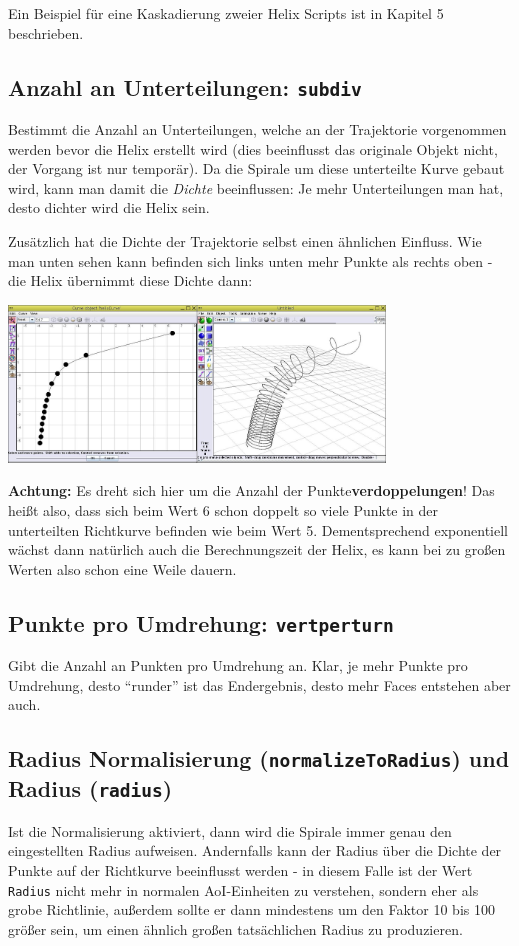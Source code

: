 \documentclass[12pt,a4paper]{scrartcl}
\begin{document}
Ein Beispiel für eine Kaskadierung zweier Helix Scripts ist in Kapitel 5
beschrieben.

\subsection{Anzahl an Unterteilungen: \texttt{subdiv}}
Bestimmt die Anzahl an Unterteilungen, welche an der Trajektorie vorgenommen
werden bevor die Helix erstellt wird (dies beeinflusst das originale Objekt
nicht, der Vorgang ist nur temporär). Da die Spirale um diese unterteilte Kurve
gebaut wird, kann man damit die \emph{Dichte} beeinflussen: Je mehr Unterteilungen
man hat, desto dichter wird die Helix sein.

Zusätzlich hat die Dichte der Trajektorie selbst einen ähnlichen Einfluss. Wie
man unten sehen kann befinden sich links unten mehr Punkte als rechts oben -
die Helix übernimmt diese Dichte dann:
\begin{center}
	\includegraphics[width=0.75\textwidth]{../pics/dichte-comp-1.jpg}
\end{center}

\textbf{Achtung:} Es dreht sich hier um die Anzahl der
Punkte\textbf{verdoppelungen}! Das heißt also, dass sich beim Wert 6 schon
doppelt so viele Punkte in der unterteilten Richtkurve befinden wie
beim Wert 5. Dementsprechend exponentiell wächst dann natürlich auch
die Berechnungszeit der Helix, es kann bei zu großen Werten also schon
eine Weile dauern.

\subsection{Punkte pro Umdrehung: \texttt{vertperturn}}
Gibt die Anzahl an Punkten pro Umdrehung an. Klar, je mehr Punkte pro
Umdrehung, desto ``runder'' ist das Endergebnis, desto mehr Faces
entstehen aber auch.

\subsection{Radius Normalisierung (\texttt{normalizeToRadius}) und Radius (\texttt{radius})}
Ist die Normalisierung aktiviert, dann wird die Spirale immer genau den 
eingestellten Radius aufweisen. Andernfalls kann der Radius über die
Dichte der Punkte auf der Richtkurve beeinflusst werden - in diesem Falle
ist der Wert \texttt{Radius} nicht mehr in normalen AoI-Einheiten zu
verstehen, sondern eher als grobe Richtlinie, außerdem sollte er dann
mindestens um den Faktor 10 bis 100 größer sein, um einen ähnlich großen
tatsächlichen Radius zu produzieren.
\end{document}
